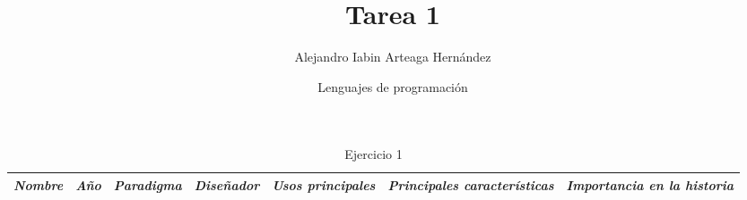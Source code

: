 \documentclass{article}
\title{Tarea 1}
\author{Alejandro Iabin Arteaga Hernández}
\date{Lenguajes de programación }
\begin{document}
\maketitle




\begin{landscape}
\begin{table}[]
\centering
\caption{Ejercicio 1}
\label{my-label}
\begin{tabular}{|l|l|l|l|l|l|l|}
\hline
\textit{\textbf{Nombre}} & \textit{\textbf{Año}} & \textit{\textbf{Paradigma}}                                   & \textit{\textbf{Diseñador}}                                 & \textit{\textbf{Usos principales}}                                                                                                            & \textit{\textbf{Principales características}}                                                                                                                                                                                                                                                                                                                                                                       & \textit{\textbf{Importancia en la historia}}                                                                                                                                                                                                                                                                                                                                                                                                                                                                                                                                                            \\ \hline

\end{tabular}
\end{table}
\end{landscape}
\end{document}
